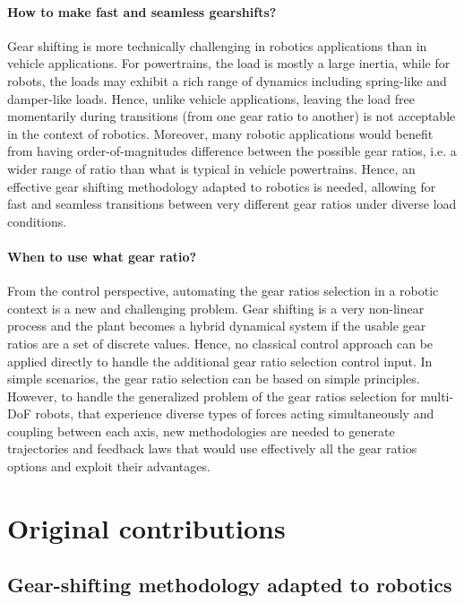 \paragraph{How to make fast and seamless gearshifts?}
Gear shifting is more technically challenging in robotics applications than in vehicle applications. For powertrains, the load is mostly a large inertia, while for robots, the loads may exhibit a rich range of dynamics including spring-like and damper-like loads. Hence, unlike vehicle applications, leaving the load free momentarily during transitions (from one gear ratio to another) is not acceptable in the context of robotics. Moreover, many robotic applications would benefit from having order-of-magnitudes difference between the possible gear ratios, i.e. a wider range of ratio than what is typical in vehicle powertrains. Hence, an effective gear shifting methodology adapted to robotics is needed, allowing for fast and seamless transitions between very different gear ratios under diverse load conditions.

\paragraph{When to use what gear ratio?}
From the control perspective, automating the gear ratios selection in a robotic context is a new and challenging problem. Gear shifting is a very non-linear process and the plant becomes a hybrid dynamical system if the usable gear ratios are a set of discrete values. Hence, no classical control approach can be applied directly to handle the additional gear ratio selection control input. In simple scenarios, the gear ratio selection can be based on simple principles. However, to handle the generalized problem of the gear ratios selection for multi-DoF robots, that experience diverse types of forces acting simultaneously and coupling between each axis, new methodologies are needed to generate trajectories and feedback laws that would use effectively all the gear ratios options and exploit their advantages.


\newpage

\section{Original contributions}
\label{sec:contribution}

\subsection{Gear-shifting methodology adapted to robotics}

